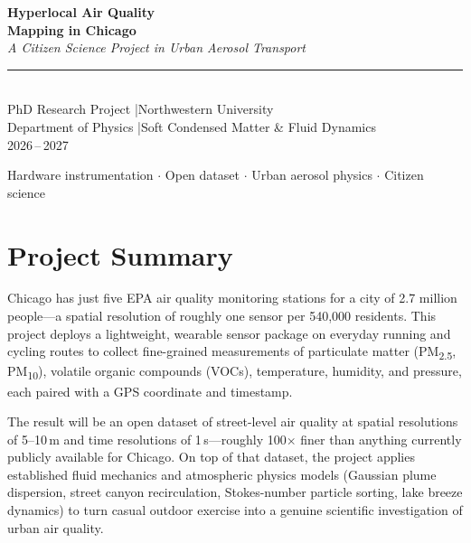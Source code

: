 \documentclass[11pt, letterpaper]{article}
\begin{document}

\thispagestyle{empty}
\begin{center}
  \vspace*{3cm}
  {\color{navy}\Huge\bfseries Hyperlocal Air Quality\\[6pt] Mapping in Chicago}\\[16pt]
  {\color{teal}\Large\itshape A Citizen Science Project in Urban Aerosol Transport}\\[20pt]
  {\color{gold}\rule{0.5\textwidth}{1.2pt}}\\[20pt]
  {\large PhD Research Project \quad|\quad Northwestern University}\\[6pt]
  {\normalsize Department of Physics \quad|\quad Soft Condensed Matter \& Fluid Dynamics}\\[6pt]
  {\normalsize 2026\,--\,2027}
\end{center}
\vfill
\begin{center}
  \small\color{midgray}
  Hardware instrumentation $\cdot$ Open dataset $\cdot$ Urban aerosol physics $\cdot$ Citizen science
\end{center}
\newpage

\tableofcontents
\newpage

\section{Project Summary}

Chicago has just five EPA air quality monitoring stations for a city of 2.7 million people---a spatial
resolution of roughly one sensor per 540{,}000 residents. This project deploys a lightweight,
wearable sensor package on everyday running and cycling routes to collect fine-grained measurements
of particulate matter (PM\textsubscript{2.5}, PM\textsubscript{10}), volatile organic compounds
(VOCs), temperature, humidity, and pressure, each paired with a GPS coordinate and timestamp.

The result will be an open dataset of street-level air quality at spatial resolutions of 5--10\,m
and time resolutions of 1\,s---roughly 100$\times$ finer than anything currently publicly available
for Chicago. On top of that dataset, the project applies established fluid mechanics and atmospheric
physics models (Gaussian plume dispersion, street canyon recirculation, Stokes-number particle
sorting, lake breeze dynamics) to turn casual outdoor exercise into a genuine scientific
investigation of urban air quality.
\end{document}
